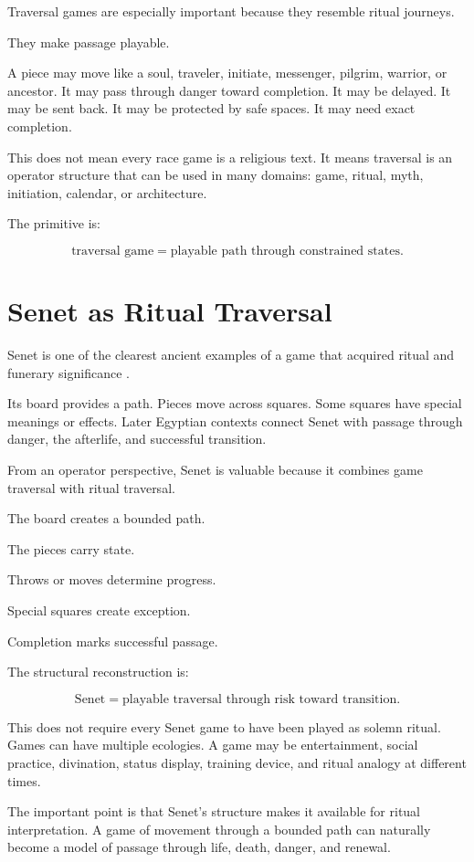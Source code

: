 \documentclass[11pt]{book}
\begin{document}
Traversal games are especially important because they resemble ritual journeys.

They make passage playable.

A piece may move like a soul, traveler, initiate, messenger, pilgrim, warrior, or ancestor. It may pass through danger toward completion. It may be delayed. It may be sent back. It may be protected by safe spaces. It may need exact completion.

This does not mean every race game is a religious text. It means traversal is an operator structure that can be used in many domains: game, ritual, myth, initiation, calendar, or architecture.

The primitive is:

\[
\text{traversal game} = \text{playable path through constrained states}.
\]

\section{Senet as Ritual Traversal}

Senet is one of the clearest ancient examples of a game that acquired ritual and funerary significance \cite{Finkel2007AncientBoardGames}.

Its board provides a path. Pieces move across squares. Some squares have special meanings or effects. Later Egyptian contexts connect Senet with passage through danger, the afterlife, and successful transition.

From an operator perspective, Senet is valuable because it combines game traversal with ritual traversal.

The board creates a bounded path.

The pieces carry state.

Throws or moves determine progress.

Special squares create exception.

Completion marks successful passage.

The structural reconstruction is:

\[
\text{Senet} = \text{playable traversal through risk toward transition}.
\]

This does not require every Senet game to have been played as solemn ritual. Games can have multiple ecologies. A game may be entertainment, social practice, divination, status display, training device, and ritual analogy at different times.

The important point is that Senet's structure makes it available for ritual interpretation. A game of movement through a bounded path can naturally become a model of passage through life, death, danger, and renewal.
\end{document}
